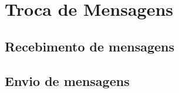 \section{Troca de Mensagens}














\subsection{Recebimento de mensagens}



\subsection{Envio de mensagens}

